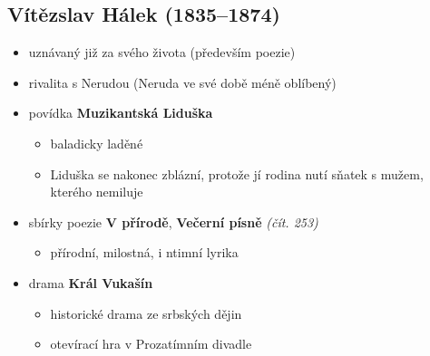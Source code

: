 \subsection{Vítězslav Hálek (1835--1874)}
\begin{itemize}
\item uznávaný již za svého života (především poezie)
\item rivalita s Nerudou (Neruda ve své době méně oblíbený)
\item povídka \textbf{Muzikantská Liduška}
	\begin{itemize}
	\item baladicky laděné
	\item Liduška se nakonec zblázní, protože jí rodina nutí sňatek s mužem, kterého nemiluje
	\end{itemize}
\item sbírky poezie \textbf{V přírodě}, \textbf{Večerní písně} \textit{(čít. 253)}
	\begin{itemize}
	\item přírodní, milostná, i ntimní lyrika
	\end{itemize}
\item drama \textbf{Král Vukašín}
	\begin{itemize}
	\item historické drama ze srbských dějin
	\item otevírací hra v Prozatímním divadle 
	\end{itemize}
\end{itemize}

